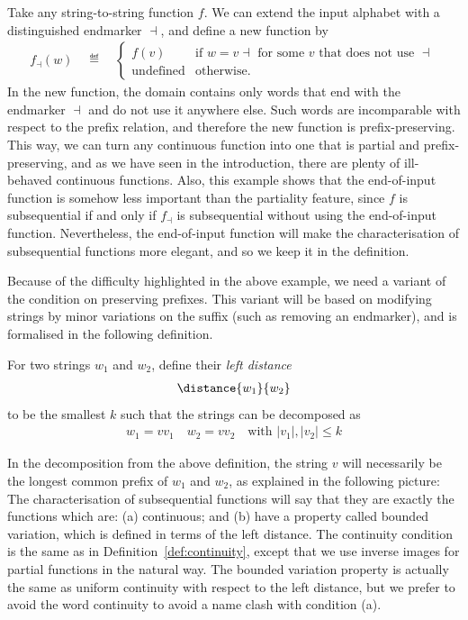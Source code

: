 \begin{myexample}[Endmarkers] \label{ex:endmarker} Take any string-to-string function $f$. We can  extend the input alphabet with a distinguished endmarker $\dashv$, and define a new function by 
\begin{align*}
f_\dashv(w) \quad \eqdef \quad
\begin{cases}
    f(v) & \text{if $w = v\dashv$ for some $v$ that does not use $\dashv$}\\
    \text{undefined} & \text{otherwise}.
\end{cases}
\end{align*}
In the new function, the domain contains only words that end with the endmarker $\dashv$ and do not use it anywhere else. Such words are incomparable with respect to the prefix relation, and therefore the new function is prefix-preserving. This way, we can turn any continuous function into one that is partial and prefix-preserving, and as we have seen in the introduction, there are plenty of ill-behaved continuous functions. Also, this example shows that the end-of-input function is somehow less important than the partiality feature, since $f$ is subsequential if and only if $f_\dashv$ is subsequential without using the end-of-input function. Nevertheless, the end-of-input function will make the characterisation of subsequential functions more elegant, and so we keep it in the definition.
\end{myexample}

Because of the difficulty highlighted in the above example, we need a variant of the condition on preserving prefixes. This variant will be based on modifying strings by minor variations on the suffix (such as removing an endmarker), and is formalised in the following definition.



\begin{definition}\label{def:left-distance}
   For two strings $w_1$ and $w_2$, define their \emph{left distance} 
    \begin{align*}
    \distance{ w_1}{w_2}
    \end{align*}
    to be the smallest $k$ such that the strings can be decomposed as 
    \begin{align*}
    w_1 = v v_1 \quad w_2 = v v_2 \quad \text{with $|v_1|,|v_2| \leq k$}
    \end{align*}
\end{definition}
In the decomposition from the above definition, the string $v$ will necessarily be the longest common prefix of $w_1$ and $w_2$, as explained in the following picture:
The characterisation of subsequential functions will say that they are exactly the functions which are: (a) continuous; and (b) have a property called bounded variation, which is defined in terms of the left distance. The continuity condition is the same as in Definition~\ref{def:continuity}, except that we use inverse images for partial functions in the natural way. The bounded variation property is actually the same as uniform continuity with respect to the left distance, but we prefer to avoid the word continuity to avoid a name clash with condition (a).


